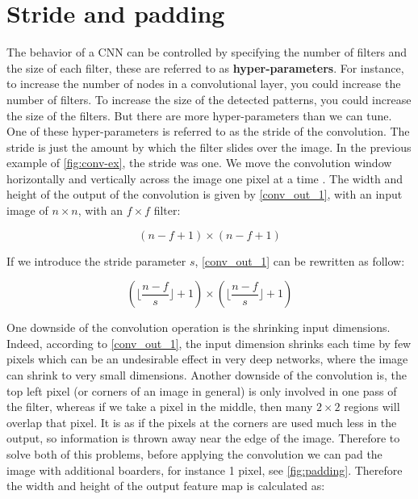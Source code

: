 \section{Stride and padding}
The behavior of a CNN can be controlled by specifying the number of filters and the size of each filter, these are referred
to as \textbf{hyper-parameters}. For instance, to increase the number of nodes in a convolutional layer, you could increase the number of filters.
To increase the size of the detected patterns, you could increase the size of the filters. But there are more hyper-parameters than we can tune.
One of these hyper-parameters is referred to as the stride of the convolution. The stride is just the amount by which the filter slides over the
image. In the previous example of \cref{fig:conv-ex}, the stride was one. We move the convolution window horizontally and vertically  across the image
one pixel at a time \cite{ud188}. The width and height of the output of the convolution is given by \cref{conv_out_1}, with an input image of $n \times n$,
with an $f \times f$ filter:

\begin{equation}
  \label{conv_out_1}
  (n - f + 1) \times (n - f + 1)
\end{equation}

If we introduce the stride parameter $s$, \cref{conv_out_1} can be rewritten as follow:

\begin{equation}
  \label{conv_out_2}
  (\lfloor\frac{n - f}{s}\rfloor + 1)\times (\lfloor\frac{n - f}{s}\rfloor + 1)
\end{equation}


One downside of the convolution operation is the shrinking input dimensions. Indeed, according to \cref{conv_out_1}, the input dimension shrinks
each time by few pixels which can be an undesirable effect in very deep networks, where the image can shrink to very small dimensions. Another
downside of the convolution is, the top left pixel (or corners of an image in general) is only involved in one pass of the filter, whereas if we
take a pixel in the middle, then many $2 \times 2$ regions will overlap that pixel. It is as if the pixels at the corners are used much less in the
output, so information is thrown away near the edge of the image. Therefore to solve both of this problems, before applying the convolution we can
pad the image with additional boarders, for instance 1 pixel, see \cref{fig:padding}. Therefore the width and height of the output feature map is
calculated as:


